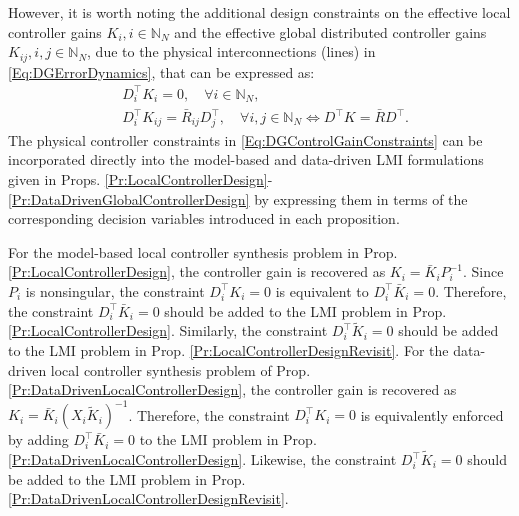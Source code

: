 \documentclass[letterpaper, 10 pt, conference]{ieeeconf}%
\newcommand{\N}{\mathbb{N}}
\newcommand{\T}{\top}
\newcommand{\0}{\mathbf{0}}
\begin{document}
However, it is worth noting the additional design constraints on the effective local controller gains $K_i, i\in\N_N$ and the effective global distributed controller gains $K_{ij}, i,j\in\N_N$, due to the physical interconnections (lines) in \eqref{Eq:DGErrorDynamics}, that can be expressed as:
\begin{equation}\label{Eq:DGControlGainConstraints}
\begin{aligned}
&D_i^\T K_i = 0,\quad \forall i\in\N_N,\\
&D_i^\T K_{ij} = \bar{R}_{ij}D_j^\T,\quad \forall i,j\in\N_N
\iff D^\T K = \bar{R}D^\T.
\end{aligned}
\end{equation} 
The physical controller constraints in \eqref{Eq:DGControlGainConstraints} can be incorporated directly into the model-based and data-driven LMI formulations given in Props. \ref{Pr:LocalControllerDesign}-\ref{Pr:DataDrivenGlobalControllerDesign} by expressing them in terms of the corresponding decision variables introduced in each proposition. 

For the model-based local controller synthesis problem in Prop. \ref{Pr:LocalControllerDesign}, the controller gain is recovered as $K_i=\bar K_iP_i^{-1}$. Since $P_i$ is nonsingular, the constraint $D_i^\T K_i=0$ is equivalent to $D_i^\T\bar K_i=0$. Therefore, the constraint $D_i^\T\bar K_i=0$ should be added to the LMI problem in Prop. \ref{Pr:LocalControllerDesign}. Similarly, the constraint $D_i^\T\tilde K_i=0$ should be added to the LMI problem in Prop. \ref{Pr:LocalControllerDesignRevisit}. 
For the data-driven local controller synthesis problem of Prop. \ref{Pr:DataDrivenLocalControllerDesign}, the controller gain is recovered as $ K_i=\bar K_i(X_i\tilde K_i)^{-1}$. Therefore, the constraint $D_i^\T K_i=0$ is equivalently enforced by adding $D_i^\T\bar K_i=0$ to the LMI problem in Prop. \ref{Pr:DataDrivenLocalControllerDesign}. Likewise, the constraint $D_i^\T\tilde K_i=0$ should be added to the LMI problem in Prop.  \ref{Pr:DataDrivenLocalControllerDesignRevisit}. 
\end{document}

